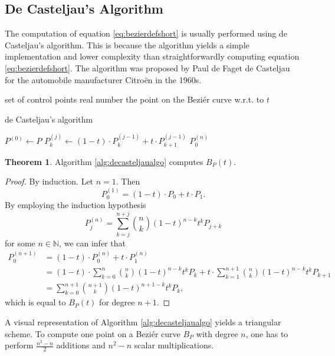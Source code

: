 \documentclass[a4paper, 11pt]{report}
\theoremstyle{definition}
\newtheorem{theorem}[definition]{Theorem}
\newcommand{\Desc}[2]{\State \makebox[12em][l]{#1}#2}
\begin{document}
\subsection{De Casteljau's Algorithm}

The computation of equation \ref{eq:bezierdefshort} is usually performed using de Casteljau's algorithm. This is because the algorithm yields a simple implementation and lower complexity than straightforwardly computing equation \ref{eq:bezierdefshort}. The algorithm was proposed by Paul de Faget de Casteljau for the automobile manufacturer Citroën in the 1960s.

\begin{algorithm}[H]
	\begin{algorithmic}[1]
		\Input
			\Desc{$P = \{P_0, P_1, ..., P_n\}$}{set of control points}
			\Desc{$t$}{real number}
		\EndInput
		\Output
			\Desc{$P^{(n)}_0 = B_P(t)$}{the point on the Beziér curve w.r.t. to $t$}
		\EndOutput

		\caption{de Casteljau's algorithm}\label{alg:decasteljaualgo}
			\State $P^{(0)} \gets P$
					\State $P^{(j)}_k \gets (1-t) \cdot P^{(j-1)}_k + t \cdot P^{(j-1)}_{k+1}$
				\EndFor
			\EndFor
			\Return $P^{(n)}_0$
		\EndProcedure
	\end{algorithmic}
\end{algorithm}

\begin{theorem}
	Algorithm \ref{alg:decasteljaualgo} computes $B_P(t)$.
\end{theorem}
\begin{proof}
	By induction. Let $n = 1$. Then
		$$ P_0^{(1)} = (1-t) \cdot P_0 + t \cdot P_1.$$
	By employing the induction hypothesis
		$$ P_j^{(n)} = \sum_{k=j}^{n+j} \binom{n}{k} (1-t)^{n-k}t^k P_{j+k}$$
	for some $n \in \mathbb{N}$, we can infer that
	\begin{align*}
		P_0^{(n+1)}	&= (1-t) \cdot P_0^{(n)} + t \cdot P_1^{(n)} \\
					&= (1-t) \cdot \sum_{k=0}^{n} \binom{n}{k} (1-t)^{n-k}t^k P_{k} + t \cdot \sum_{k=1}^{n+1} \binom{n}{k} (1-t)^{n-k}t^k P_{k+1} \\
					&= \sum_{k=0}^{n+1} \binom{n+1}{k} (1-t)^{n+1-k}t^k P_{k},
	\end{align*}
	which is equal to $B_P(t)$ for degree $n+1$.
\end{proof}

A visual representation of Algorithm \ref{alg:decasteljaualgo} yields a triangular scheme. To compute one point on a Beziér curve $B_P$ with degree $n$, one has to perform $\frac{n^2-n}{2}$ additions and $n^2-n$ scalar multiplications.
\end{document}
